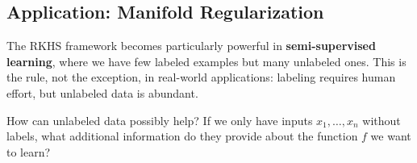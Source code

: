 \begin{notechapter}





\section{Application: Manifold Regularization}
\label{rkhs:sec:applications}

The RKHS framework becomes particularly powerful in 
\textbf{semi-supervised learning}, where we have few labeled
examples but many unlabeled ones. This is the rule, not the
exception, in real-world applications: labeling requires human
effort, but unlabeled data is abundant.

\begin{insightbox}
How can unlabeled data possibly help? If we only have inputs 
$x_1,\ldots,x_n$ without labels, what additional information do 
they provide about the function $f$ we want to learn?


\end{insightbox}
\end{notechapter}
